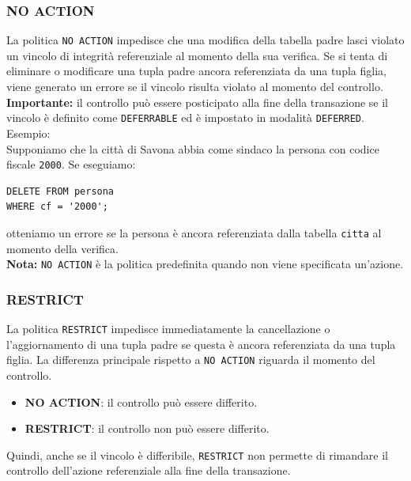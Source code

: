 \subsubsection{NO ACTION}
La politica \texttt{NO ACTION} impedisce
che una modifica della tabella padre lasci
violato un vincolo di integrità referenziale
al momento della sua verifica.
Se si tenta di eliminare o modificare
una tupla padre ancora referenziata
da una tupla figlia, viene generato un errore
se il vincolo risulta violato al momento
del controllo.\\
\textbf{Importante:} il controllo può essere
posticipato alla fine della transazione
se il vincolo è definito come
\texttt{DEFERRABLE} ed è impostato
in modalità \texttt{DEFERRED}.\\
\textcolor{verdeEsempio}{Esempio:}\\
Supponiamo che la città di Savona
abbia come sindaco la persona con
codice fiscale \texttt{2000}.
Se eseguiamo:
\begin{verbatim}
DELETE FROM persona
WHERE cf = '2000';
\end{verbatim}
otteniamo un errore se la persona
è ancora referenziata dalla tabella
\texttt{citta} al momento della verifica.\\
\textbf{Nota:} \texttt{NO ACTION} è la
politica predefinita quando non viene
specificata un'azione.
\subsubsection{RESTRICT}
La politica \texttt{RESTRICT} impedisce
immediatamente la cancellazione o
l'aggiornamento di una tupla padre
se questa è ancora referenziata
da una tupla figlia.
La differenza principale rispetto
a \texttt{NO ACTION} riguarda
il momento del controllo.
\begin{itemize}
    \item \textbf{NO ACTION}: il controllo
    può essere differito.

    \item \textbf{RESTRICT}: il controllo
    non può essere differito.
\end{itemize}
\noindent Quindi, anche se il vincolo è differibile,
\texttt{RESTRICT} non permette di
rimandare il controllo dell'azione
referenziale alla fine della transazione.
